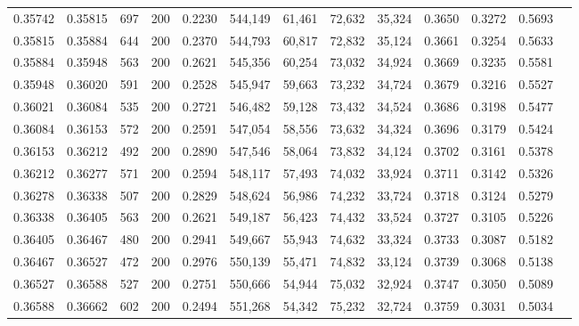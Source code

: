 \begin{tabular}{rrrrrrrrrrrrr}
0.35742 & 0.35815 &   697 & 200 &                                     0.2230 & 544,149 &  61,461 &  72,632 &  35,324 & 0.3650 & 0.3272 & 0.5693 \\
0.35815 & 0.35884 &   644 & 200 &                                     0.2370 & 544,793 &  60,817 &  72,832 &  35,124 & 0.3661 & 0.3254 & 0.5633 \\
0.35884 & 0.35948 &   563 & 200 &                                     0.2621 & 545,356 &  60,254 &  73,032 &  34,924 & 0.3669 & 0.3235 & 0.5581 \\
0.35948 & 0.36020 &   591 & 200 &                                     0.2528 & 545,947 &  59,663 &  73,232 &  34,724 & 0.3679 & 0.3216 & 0.5527 \\
0.36021 & 0.36084 &   535 & 200 &                                     0.2721 & 546,482 &  59,128 &  73,432 &  34,524 & 0.3686 & 0.3198 & 0.5477 \\
0.36084 & 0.36153 &   572 & 200 &                                     0.2591 & 547,054 &  58,556 &  73,632 &  34,324 & 0.3696 & 0.3179 & 0.5424 \\
0.36153 & 0.36212 &   492 & 200 &                                     0.2890 & 547,546 &  58,064 &  73,832 &  34,124 & 0.3702 & 0.3161 & 0.5378 \\
0.36212 & 0.36277 &   571 & 200 &                                     0.2594 & 548,117 &  57,493 &  74,032 &  33,924 & 0.3711 & 0.3142 & 0.5326 \\
0.36278 & 0.36338 &   507 & 200 &                                     0.2829 & 548,624 &  56,986 &  74,232 &  33,724 & 0.3718 & 0.3124 & 0.5279 \\
0.36338 & 0.36405 &   563 & 200 &                                     0.2621 & 549,187 &  56,423 &  74,432 &  33,524 & 0.3727 & 0.3105 & 0.5226 \\
0.36405 & 0.36467 &   480 & 200 &                                     0.2941 & 549,667 &  55,943 &  74,632 &  33,324 & 0.3733 & 0.3087 & 0.5182 \\
0.36467 & 0.36527 &   472 & 200 &                                     0.2976 & 550,139 &  55,471 &  74,832 &  33,124 & 0.3739 & 0.3068 & 0.5138 \\
0.36527 & 0.36588 &   527 & 200 &                                     0.2751 & 550,666 &  54,944 &  75,032 &  32,924 & 0.3747 & 0.3050 & 0.5089 \\
0.36588 & 0.36662 &   602 & 200 &                                     0.2494 & 551,268 &  54,342 &  75,232 &  32,724 & 0.3759 & 0.3031 & 0.5034 \\

\end{tabular}
